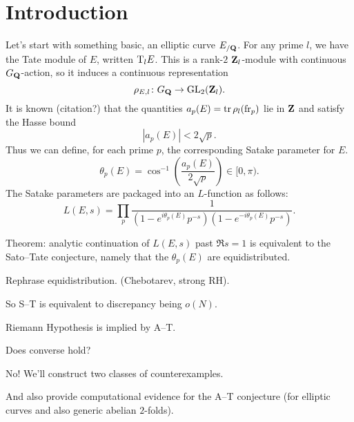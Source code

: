 
\chapter{Introduction}





Let's start with something basic, an elliptic curve $E_{/\mathbf{Q}}$. For any 
prime $l$, we have the Tate module of $E$, written $\mathrm{T}_l E$. This is a 
rank-$2$ $\mathbf{Z}_l$-module with continuous $G_{\mathbf{Q}}$-action, so it induces a 
continuous representation 
\[
	\rho_{E,l} \colon G_{\mathbf{Q}} \to \operatorname{GL}_2(\mathbf{Z}_l) .
\]
It is known (citation?) that the quantities $a_p(E) = \operatorname{tr} \rho_l(\mathrm{fr}_p)$ lie 
in $\mathbf{Z}$ and satisfy the Hasse bound 
\[
	|a_p(E)| < 2\sqrt p .
\]
Thus we can define, for each prime $p$, the corresponding Satake parameter for 
$E$. 
\[
	\theta_p(E) = \cos^{-1}\left(\frac{a_p(E)}{2\sqrt p}\right) \in [0,\pi) .
\]
The Satake parameters are packaged into an $L$-function as follows:
\[
	L(E,s) = \prod_p \frac{1}{(1 - e^{i \theta_p(E)} p^{-s})(1- e^{-i \theta_p(E)} p^{-s})} .
\]

Theorem: analytic continuation of $L(E,s)$ past $\Re s=1$ is equivalent to the 
Sato--Tate conjecture, namely that the $\theta_p(E)$ are equidistributed. 

Rephrase equidistribution. (Chebotarev, strong RH). 

So S--T is equivalent to discrepancy being $o(N)$. 

Riemann Hypothesis is implied by A--T. 

Does converse hold?

No! We'll construct two classes of counterexamples. 

And also provide computational evidence for the A--T conjecture (for elliptic 
curves and also generic abelian $2$-folds). 